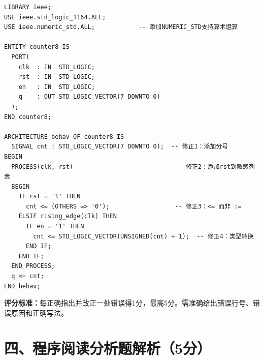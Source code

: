 \begin{lstlisting}[caption={修正后的8位计数器VHDL代码}]
LIBRARY ieee;
USE ieee.std_logic_1164.ALL;
USE ieee.numeric_std.ALL;            -- 添加NUMERIC_STD支持算术运算

ENTITY counter8 IS
  PORT(
    clk  : IN  STD_LOGIC;
    rst  : IN  STD_LOGIC;
    en   : IN  STD_LOGIC;
    q    : OUT STD_LOGIC_VECTOR(7 DOWNTO 0)
  );
END counter8;

ARCHITECTURE behav OF counter8 IS
  SIGNAL cnt : STD_LOGIC_VECTOR(7 DOWNTO 0);  -- 修正1：添加分号
BEGIN
  PROCESS(clk, rst)                            -- 修正2：添加rst到敏感列表
  BEGIN
    IF rst = '1' THEN
      cnt <= (OTHERS => '0');                  -- 修正3：<= 而非 :=
    ELSIF rising_edge(clk) THEN
      IF en = '1' THEN
        cnt <= STD_LOGIC_VECTOR(UNSIGNED(cnt) + 1);  -- 修正4：类型转换
      END IF;
    END IF;
  END PROCESS;
  q <= cnt;
END behav;
\end{lstlisting}

\textbf{评分标准：}每正确指出并改正一处错误得1分，最高5分。需准确给出错误行号、错误原因和正确写法。

\section{四、程序阅读分析题解析（5分）}

